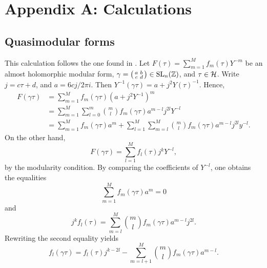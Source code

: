 \section{Appendix A: Calculations}

\subsection{Quasimodular forms}

\begin{calc} \label{cp:almost-holomorphic-modular-form-no-constant-term}
 This calculation follows the one found in \cite{Bloch-Okounkov}.
 Let $F(\tau)=\sum_{m=1}^Mf_m(\tau)Y^{-m}$ be an almost holomorphic modular form, $\gamma=
 \bigl(\begin{smallmatrix}
 a&b\\ c&d
 \end{smallmatrix} \bigr)
 \in \operatorname{SL}_n(\mathbb{Z})$,
 and $\tau \in \mathcal{H}$.
 Write $j=c\tau+d$, and $a=6cj/2\pi i$. Then $Y^{-1}(\gamma\tau)=a+j^2Y(\tau)^{-1}$. Hence,
 \begin{align*}
  F(\gamma\tau)&=\sum_{m=1}^Mf_m(\gamma\tau)(a+j^2Y^{-1})^m\\
               &=\sum_{m=1}^M\sum_{l=0}^m\binom{m}{l}f_m(\gamma\tau)a^{m-l}j^{2l}Y^{-l}\\
               &=\sum_{m=1}^Mf_m(\gamma\tau)a^m + \sum_{l=1}^M\sum_{m=l}^M\binom{m}{l}f_m(\gamma\tau)a^{m-l}j^{2l}y^{-l}.
 \end{align*}
 On the other hand,
 \[F(\gamma\tau)=\sum_{l=1}^Mf_l(\tau)j^kY^{-l},\]
 by the modularity condition. By comparing the coefficients of $Y^{-l}$, one obtains the equalities
 \begin{equation} \label{eq:coeff-zero}
 \sum_{m=1}^Mf_m(\gamma\tau)a^m=0
 \end{equation} and \[j^kf_l(\tau)=\sum_{m=l}^M\binom{m}{l}f_m(\gamma\tau)a^{m-l}j^{2l}.\]
 Rewriting the second equality yields
 \begin{equation} \label{eq:coeff-l}
  f_l(\gamma\tau)=f_l(\tau)j^{k-2l}-\sum_{m=l+1}^M\binom{m}{l}f_m(\gamma\tau)a^{m-l}.
 \end{equation}


\end{calc}
